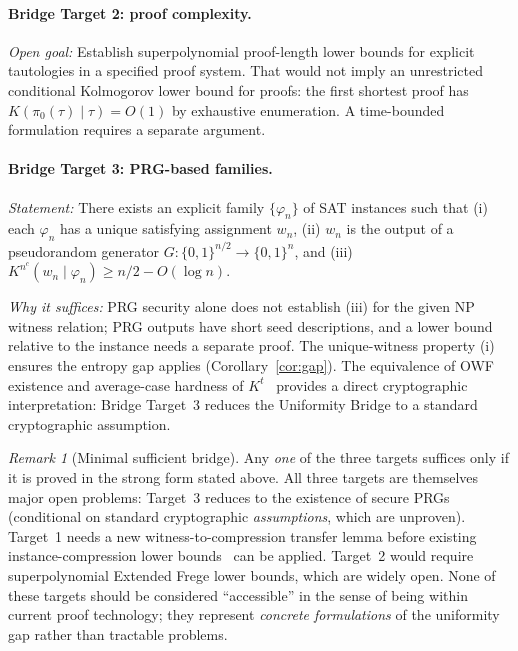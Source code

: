 \documentclass[aps,prd,twocolumn,superscriptaddress,nofootinbib]{revtex4-2}
\theoremstyle{definition}
\theoremstyle{remark}
\newtheorem{remark}[theorem]{Remark}
\begin{document}
\paragraph*{Bridge Target 2: proof complexity.}
\emph{Open goal:} Establish superpolynomial proof-length lower
bounds for explicit tautologies in a specified proof system.
That would not imply an unrestricted conditional
Kolmogorov lower bound for proofs: the first shortest proof
has $K(\pi_0(\tau)\mid\tau)=O(1)$ by exhaustive enumeration.
A time-bounded formulation requires a separate argument.

\paragraph*{Bridge Target 3: PRG-based families.}
\emph{Statement:} There exists an explicit family $\{\varphi_n\}$ of SAT instances such that (i) each $\varphi_n$ has a unique satisfying assignment $w_n$, (ii) $w_n$ is the output of a pseudorandom generator $G: \{0,1\}^{n/2} \to \{0,1\}^n$, and (iii) $K^{n^c}(w_n \mid \varphi_n) \geq n/2 - O(\log n)$.

\emph{Why it suffices:} PRG security alone does not establish (iii) for the given NP witness relation; PRG outputs have short seed descriptions, and a lower bound relative to the instance needs a separate proof. The unique-witness property (i) ensures the entropy gap applies (Corollary~\ref{cor:gap}). The equivalence of OWF existence and average-case hardness of $K^t$~\cite{LiuPass2020} provides a direct cryptographic interpretation: Bridge Target~3 reduces the Uniformity Bridge to a standard cryptographic assumption.

\begin{remark}[Minimal sufficient bridge]
\label{rem:minimal-bridge}
Any \emph{one} of the three targets suffices only if it is proved in the strong form stated above. All three targets are themselves major open problems: Target~3 reduces to the existence of secure PRGs (conditional on standard cryptographic \emph{assumptions}, which are unproven). Target~1 needs a new witness-to-compression transfer lemma before existing instance-compression lower bounds~\cite{Drucker2015} can be applied. Target~2 would require superpolynomial Extended Frege lower bounds, which are widely open. None of these targets should be considered ``accessible'' in the sense of being within current proof technology; they represent \emph{concrete formulations} of the uniformity gap rather than tractable problems.
\end{remark}
\end{document}
